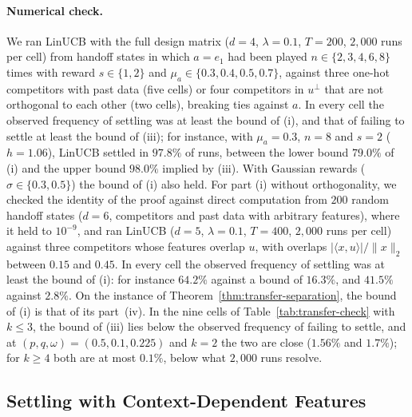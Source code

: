 \documentclass[anon]{alt2027} %
\begin{document}
\paragraph{Numerical check.} We ran LinUCB with the full design matrix
($d=4$, $\lambda=0.1$, $T=200$, $2{,}000$ runs per cell) from handoff states
in which $a=e_1$ had been played $n\in\{2,3,4,6,8\}$ times with reward
$s\in\{1,2\}$ and $\mu_a\in\{0.3,0.4,0.5,0.7\}$, against three one-hot
competitors with past data (five cells) or four competitors in $u^\perp$
that are not orthogonal to each other (two cells), breaking ties against
$a$. In every cell the observed frequency of settling was at least the bound
of (i), and that of failing to settle at least the bound of (iii); for
instance, with $\mu_a=0.3$, $n=8$ and $s=2$ ($h=1.06$), LinUCB settled in
$97.8\%$ of runs, between the lower bound $79.0\%$ of (i) and the upper
bound $98.0\%$ implied by (iii). With Gaussian
rewards ($\sigma\in\{0.3,0.5\}$) the bound of (i) also held. For part (i) without
orthogonality, we checked the identity of the proof against direct
computation from $200$ random handoff states ($d=6$, competitors and past
data with arbitrary features), where it held to $10^{-9}$, and ran LinUCB
($d=5$, $\lambda=0.1$, $T=400$, $2{,}000$ runs per cell) against three
competitors whose features overlap $u$, with overlaps
$|\langle x,u\rangle|/\|x\|_2$ between $0.15$ and $0.45$. In every cell the
observed frequency of settling was at least the bound of (i): for instance
$64.2\%$ against a bound of $16.3\%$, and $41.5\%$ against $2.8\%$. On the instance
of Theorem~\ref{thm:transfer-separation}, the bound of (i) is that of its
part~(iv). In the nine cells of Table~\ref{tab:transfer-check} with $k\le3$,
the bound of (iii) lies below the observed frequency of failing to settle, and
at $(p,q,\omega)=(0.5,0.1,0.225)$ and $k=2$ the two are close ($1.56\%$ and
$1.7\%$); for $k\ge4$ both are at most $0.1\%$, below what $2{,}000$ runs
resolve.

\subsection{Settling with Context-Dependent Features}
\label{app:settling-context}
\end{document}
